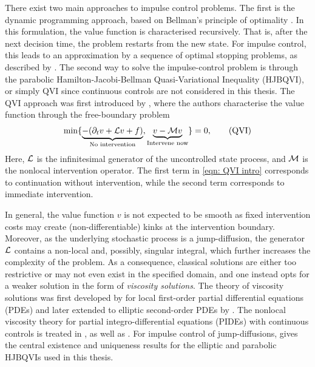 There exist two main approaches to impulse control problems. The first is the dynamic programming approach, based on Bellman's principle of optimality \cite{bellman1957dynamic}. In this formulation, the value function is characterised recursively. That is, after the next decision time, the problem restarts from the new state. For impulse control, this leads to an approximation by a sequence of optimal stopping problems, as described by \textcite{oksendal2007applied}. The second way to solve the impulse-control problem is through the parabolic Hamilton-Jacobi-Bellman Quasi-Variational Inequality (HJBQVI), or simply QVI since continuous controls are not considered in this thesis. The QVI approach was first introduced by \textcite{bensoussan1975nouvelles}, where the authors characterise the value function through the free-boundary problem
\begin{equation}
    \min\{ \underbrace{- (\partial_t v + \mathcal{L} v + f)}_{\text{No intervention}}, \underbrace{v - \mathcal{M} v}_{\text{Intervene now}}\} = 0, 
    \tag{QVI}
    \label{eqn: QVI intro}
\end{equation}
Here, $\mathcal{L}$ is the infinitesimal generator of the uncontrolled state process, and $\mathcal{M}$ is the nonlocal intervention operator. The first term in \eqref{eqn: QVI intro} corresponds to continuation without intervention, while the second term corresponds to immediate intervention. 

In general, the value function $v$ is not expected to be smooth as fixed intervention costs may create (non-differentiable) kinks at the intervention boundary. Moreover, as the underlying stochastic process is a jump-diffusion, the generator $\mathcal{L}$ contains a non-local and, possibly, singular integral, which further increases the complexity of the problem. As a consequence, classical solutions are either too restrictive or may not even exist in the specified domain, and one instead opts for a weaker solution in the form of \textit{viscosity solutions}. The theory of viscosity solutions was first developed by \textcite{crandall1983viscosity} for local first-order partial differential equations (PDEs) and later extended to elliptic second-order PDEs by \textcite{crandall1992user}. The nonlocal viscosity theory for partial integro-differential equations (PIDEs) with continuous controls is treated in \textcite{barles2008second}, as well as \textcite{jakobsen2006maximum}. For impulse control of jump-diffusions, \textcite{seydel2010generalexistenceuniquenessviscosity} gives the central existence and uniqueness results for the elliptic and parabolic HJBQVIs used in this thesis. 

